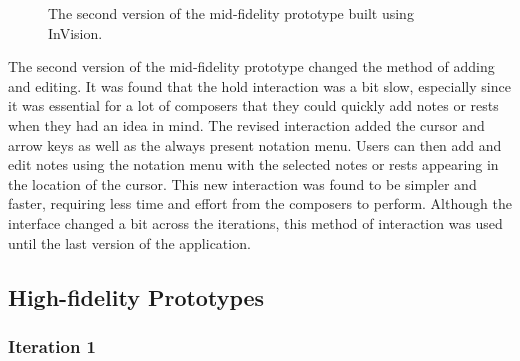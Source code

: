 			\begin{figure}[H]
				\centering
			    \caption{The second version of the mid-fidelity prototype built using InVision.}
			    \label{fig:invision_v2}
			\end{figure} 

			The second version of the mid-fidelity prototype changed the method of adding and editing. It was found that the hold interaction was a bit slow, especially since it was essential for a lot of composers that they could quickly add notes or rests when they had an idea in mind. The revised interaction added the cursor and arrow keys as well as the always present notation menu. Users can then add and edit notes using the notation menu with the selected notes or rests appearing in the location of the cursor. This new interaction was found to be simpler and faster, requiring less time and effort from the composers to perform. Although the interface changed a bit across the iterations, this method of interaction was used until the last version of the application. 

		\subsection{High-fidelity Prototypes}
		\label{sec:high-fidelity-prototypes}

			\subsubsection{Iteration 1}

